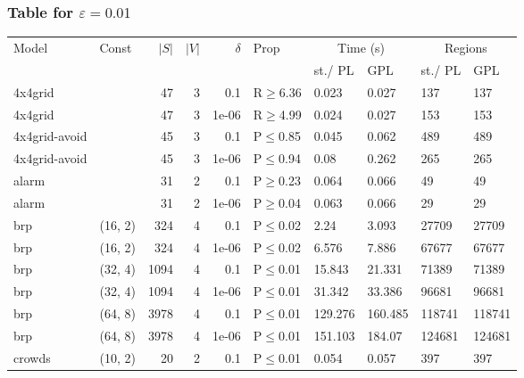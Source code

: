 \subsubsection{Table for \(\varepsilon=0.01\)}
\begin{longtable}{llrrrlllll}

        \toprule
        Model & Const & $|S|$ & $|V|$ & $\delta$ & Prop & \multicolumn{2}{c}{Time (s)} & \multicolumn{2}{c}{Regions} \\
        \cmidrule(ll){7-8} \cmidrule(ll){9-10}
        & & & & & & st./ PL & GPL & st./ PL & GPL \\
        \midrule
        
 4x4grid       &           &     	47 &   3 & 0.1   & R$\geq$6.36  & 0.023   & 0.027   & 137    & 137    \\
 4x4grid       &           &     	47 &   3 & 1e-06 & R$\geq$4.99  & 0.024   & 0.027   & 153    & 153    \\
 4x4grid-avoid &           &     	45 &   3 & 0.1   & P$\leq$0.85  & 0.045   & 0.062   & 489    & 489    \\
 4x4grid-avoid &           &     	45 &   3 & 1e-06 & P$\leq$0.94  & 0.08    & 0.262   & 265    & 265    \\
 alarm         &           &     	31 &   2 & 0.1   & P$\geq$0.23  & 0.064   & 0.066   & 49     & 49     \\
 alarm         &           &     	31 &   2 & 1e-06 & P$\geq$0.04  & 0.063   & 0.066   & 29     & 29     \\
 brp           & (16, 2)   &    	324 &   4 & 0.1   & P$\leq$0.02  & 2.24    & 3.093   & 27709  & 27709  \\
 brp           & (16, 2)   &    	324 &   4 & 1e-06 & P$\leq$0.02  & 6.576   & 7.886   & 67677  & 67677  \\
 brp           & (32, 4)   &   	1094 &   4 & 0.1   & P$\leq$0.01  & 15.843  & 21.331  & 71389  & 71389  \\
 brp           & (32, 4)   &   	1094 &   4 & 1e-06 & P$\leq$0.01  & 31.342  & 33.386  & 96681  & 96681  \\
 brp           & (64, 8)   &   	3978 &   4 & 0.1   & P$\leq$0.01  & 129.276 & 160.485 & 118741 & 118741 \\
 brp           & (64, 8)   &   	3978 &   4 & 1e-06 & P$\leq$0.01  & 151.103 & 184.07  & 124681 & 124681 \\
 crowds        & (10, 2)   &     	20 &   2 & 0.1   & P$\leq$0.01  & 0.054   & 0.057   & 397    & 397    \\

\end{longtable}
